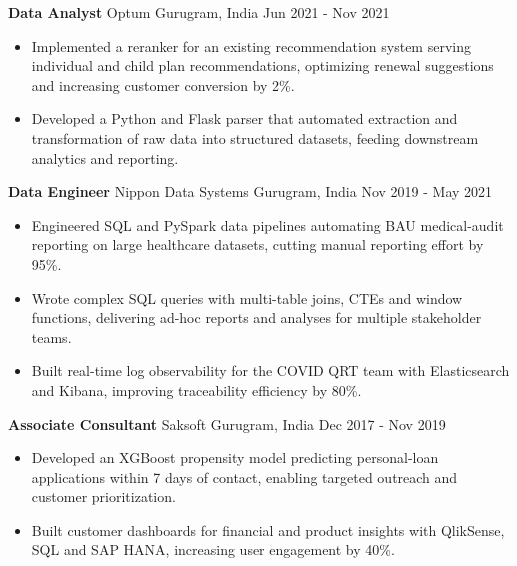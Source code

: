 \documentclass[10pt,a4paper]{article}
\newcommand{\role}[4]{\textbf{#1} \textbar{} #2 \hfill #3 \textbar{} #4\par}
\begin{document}
\vspace{3pt}
\role{Data Analyst}{Optum}{Gurugram, India}{Jun 2021 - Nov 2021}
\begin{itemize}
  \item Implemented a reranker for an existing recommendation system serving individual and child plan recommendations, optimizing renewal suggestions and increasing customer conversion by 2\%.
  \item Developed a Python and Flask parser that automated extraction and transformation of raw data into structured datasets, feeding downstream analytics and reporting.
\end{itemize}
\vspace{3pt}
\role{Data Engineer}{Nippon Data Systems}{Gurugram, India}{Nov 2019 - May 2021}
\begin{itemize}
  \item Engineered SQL and PySpark data pipelines automating BAU medical-audit reporting on large healthcare datasets, cutting manual reporting effort by 95\%.
  \item Wrote complex SQL queries with multi-table joins, CTEs and window functions, delivering ad-hoc reports and analyses for multiple stakeholder teams.
  \item Built real-time log observability for the COVID QRT team with Elasticsearch and Kibana, improving traceability efficiency by 80\%.
\end{itemize}
\vspace{3pt}
\role{Associate Consultant}{Saksoft}{Gurugram, India}{Dec 2017 - Nov 2019}
\begin{itemize}
  \item Developed an XGBoost propensity model predicting personal-loan applications within 7 days of contact, enabling targeted outreach and customer prioritization.
  \item Built customer dashboards for financial and product insights with QlikSense, SQL and SAP HANA, increasing user engagement by 40\%.
\end{itemize}
\end{document}
